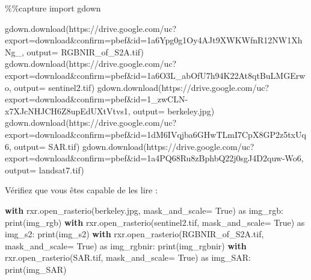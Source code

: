 \documentclass[
  french,
  11pt,
  letterpaper,
  open=any,
  twoside=false,
  french]{scrbook}
\newenvironment{Shaded}{\begin{snugshade}}{\end{snugshade}}
\newcommand{\BuiltInTok}[1]{\textcolor[rgb]{0.00,0.23,0.31}{#1}}
\newcommand{\ControlFlowTok}[1]{\textcolor[rgb]{0.00,0.23,0.31}{\textbf{#1}}}
\newcommand{\ImportTok}[1]{\textcolor[rgb]{0.00,0.46,0.62}{#1}}
\newcommand{\NormalTok}[1]{\textcolor[rgb]{0.00,0.23,0.31}{#1}}
\newcommand{\OperatorTok}[1]{\textcolor[rgb]{0.37,0.37,0.37}{#1}}
\newcommand{\StringTok}[1]{\textcolor[rgb]{0.13,0.47,0.30}{#1}}
\newcommand{\VariableTok}[1]{\textcolor[rgb]{0.07,0.07,0.07}{#1}}
\begin{document}
\begin{Shaded}
\begin{Highlighting}[]
\OperatorTok{\%\%}\NormalTok{capture}
\ImportTok{import}\NormalTok{ gdown}

\NormalTok{gdown.download(}\StringTok{\textquotesingle{}https://drive.google.com/uc?export=download\&confirm=pbef\&id=1a6Ypg0g1Oy4AJt9XWKWfnR12NW1XhNg\_\textquotesingle{}}\NormalTok{, output}\OperatorTok{=} \StringTok{\textquotesingle{}RGBNIR\_of\_S2A.tif\textquotesingle{}}\NormalTok{)}
\NormalTok{gdown.download(}\StringTok{\textquotesingle{}https://drive.google.com/uc?export=download\&confirm=pbef\&id=1a6O3L\_abOfU7h94K22At8qtBuLMGErwo\textquotesingle{}}\NormalTok{, output}\OperatorTok{=} \StringTok{\textquotesingle{}sentinel2.tif\textquotesingle{}}\NormalTok{)}
\NormalTok{gdown.download(}\StringTok{\textquotesingle{}https://drive.google.com/uc?export=download\&confirm=pbef\&id=1\_zwCLN{-}x7XJcNHJCH6Z8upEdUXtVtvs1\textquotesingle{}}\NormalTok{, output}\OperatorTok{=} \StringTok{\textquotesingle{}berkeley.jpg\textquotesingle{}}\NormalTok{)}
\NormalTok{gdown.download(}\StringTok{\textquotesingle{}https://drive.google.com/uc?export=download\&confirm=pbef\&id=1dM6IVqjba6GHwTLmI7CpX8GP2z5txUq6\textquotesingle{}}\NormalTok{, output}\OperatorTok{=} \StringTok{\textquotesingle{}SAR.tif\textquotesingle{}}\NormalTok{)}
\NormalTok{gdown.download(}\StringTok{\textquotesingle{}https://drive.google.com/uc?export=download\&confirm=pbef\&id=1a4PQ68Ru8zBphbQ22j0sgJ4D2quw{-}Wo6\textquotesingle{}}\NormalTok{, output}\OperatorTok{=} \StringTok{\textquotesingle{}landsat7.tif\textquotesingle{}}\NormalTok{)}
\end{Highlighting}
\end{Shaded}

Vérifiez que vous êtes capable de les lire :

\begin{Shaded}
\begin{Highlighting}[]
\ControlFlowTok{with}\NormalTok{ rxr.open\_rasterio(}\StringTok{\textquotesingle{}berkeley.jpg\textquotesingle{}}\NormalTok{, mask\_and\_scale}\OperatorTok{=} \VariableTok{True}\NormalTok{) }\ImportTok{as}\NormalTok{ img\_rgb:}
    \BuiltInTok{print}\NormalTok{(img\_rgb)}
\ControlFlowTok{with}\NormalTok{ rxr.open\_rasterio(}\StringTok{\textquotesingle{}sentinel2.tif\textquotesingle{}}\NormalTok{, mask\_and\_scale}\OperatorTok{=} \VariableTok{True}\NormalTok{) }\ImportTok{as}\NormalTok{ img\_s2:}
    \BuiltInTok{print}\NormalTok{(img\_s2)}
\ControlFlowTok{with}\NormalTok{ rxr.open\_rasterio(}\StringTok{\textquotesingle{}RGBNIR\_of\_S2A.tif\textquotesingle{}}\NormalTok{, mask\_and\_scale}\OperatorTok{=} \VariableTok{True}\NormalTok{) }\ImportTok{as}\NormalTok{ img\_rgbnir:}
    \BuiltInTok{print}\NormalTok{(img\_rgbnir)}
\ControlFlowTok{with}\NormalTok{ rxr.open\_rasterio(}\StringTok{\textquotesingle{}SAR.tif\textquotesingle{}}\NormalTok{, mask\_and\_scale}\OperatorTok{=} \VariableTok{True}\NormalTok{) }\ImportTok{as}\NormalTok{ img\_SAR:}
    \BuiltInTok{print}\NormalTok{(img\_SAR)}
\end{Highlighting}
\end{Shaded}
\end{document}
